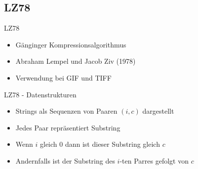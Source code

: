 \subsection{LZ78}

\begin{frame}{\FrameName}
	\begin{block}{LZ78}
		\begin{itemize}[<+->]
			\item Gänginger Kompressionsalgorithmus
			\item Abraham Lempel und Jacob Ziv (1978)
			\item Verwendung bei GIF und TIFF 
		\end{itemize}
	\end{block}
	\end{frame}

\begin{frame}{\FrameName}
\begin{block}{LZ78 - Datenstrukturen}
	\begin{itemize}[<+->]
		\item Strings als Sequenzen von Paaren $(i,c)$ dargestellt \linebreak {}
		\item Jedes Paar repräsentiert Substring
		\item Wenn $i$ gleich $0$ dann ist dieser Substring gleich $c$
		\item Andernfalls ist der Substring des $i$-ten Parres gefolgt von $c$
	\end{itemize}
\end{block}
\end{frame}

